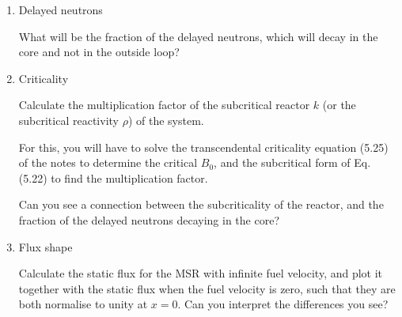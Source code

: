 \documentclass[openright, 12pt, a4paper, twoside, onecolumn]{book}
\newcommand*{\smallspace}{\vspace{0.5cm}}
\begin{document}
\begin{enumerate}
\item Delayed neutrons
\smallspace

What will be the fraction of the delayed neutrons, which will decay in the core and not in the outside loop?

\item Criticality
\smallspace

Calculate the multiplication factor of the subcritical reactor $k$ (or the subcritical reactivity $\rho$) of the system. 
\smallspace

For this, you will have to solve the transcendental criticality equation (5.25) of the notes to determine the critical $B_{0}$, and the subcritical form of Eq. (5.22) to find the multiplication factor.

Can you see a connection between the subcriticality of the reactor, and the fraction of the delayed neutrons decaying in the core?

\item Flux shape
\smallspace

Calculate  the static flux for the MSR with infinite fuel velocity, and plot it together with the static flux when the fuel velocity is zero, such that they are both normalise to unity at $x = 0$. Can you interpret the differences you see?

\end{enumerate}
\end{document}
